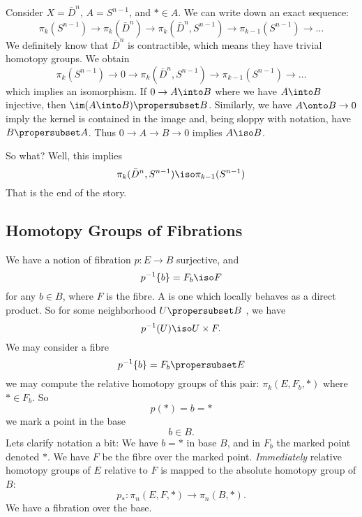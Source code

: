 Consider  $X=\bar{D}^n$, $A=S^{n-1}$, and $*\in A$. We can write
down an exact sequence:
\begin{equation}
\pi_{k}(S^{n-1})\to\pi_{k}(\bar{D}^{n})\to\pi_{k}(\bar{D}^{n},S^{n-1})\to
\pi_{k-1}(S^{n-1})\to\dots 
\end{equation}
We definitely know that $\bar{D}^n$ is contractible, which means
they have trivial homotopy groups. We obtain
\begin{equation}
\pi_{k}(S^{n-1})\to0\to\pi_{k}(\bar{D}^{n},S^{n-1})\to
\pi_{k-1}(S^{n-1})\to\dots 
\end{equation}
which implies an isomorphism.
If $0\to A\into B$ where we have $A\into B$ injective, then
$\im(A\into B)\propersubset B$. Similarly, we have $A\onto B\to
0$ imply the kernel is contained in the image and, being sloppy
with notation, have $B\propersubset A$. Thus $0\to A\to B\to 0$
implies $A\iso B$.

So what? Well, this implies
\begin{equation}
\pi_{k}(\bar{D}^{n},S^{n-1})\iso
\pi_{k-1}(S^{n-1})
\end{equation}
That is the end of the story.

\subsection{Homotopy Groups of Fibrations}
We have a notion of fibration $p\colon E\to B$ surjective, and
\begin{equation}
p^{-1}\{b\}=F_{b}\iso F
\end{equation}
for any $b\in B$, where $F$ is the fibre. A 
is one which locally behaves as a direct product. So for
some neighborhood $U\propersubset B$ , we have
\begin{equation}
p^{-1}(U)\iso U\times F.
\end{equation}
We may consider a fibre
\begin{equation}
p^{-1}\{b\}=F_{b}\propersubset E
\end{equation}
we may compute the relative homotopy groups of this pair:
$\pi_{k}(E,F_{b},*)$ where $*\in F_{b}$. So
\begin{equation}
p(*)=b=*
\end{equation}
we mark a point in the base
\begin{equation}
b\in B.
\end{equation}
Lets clarify notation a bit: We have $b=*$ in base $B$, and in
$F_{b}$ the marked point denoted $*$. We have $F$ be the fibre
over the marked point. \emph{Immediately} relative homotopy
groups of $E$ relative to $F$ is mapped to the absolute homotopy
group of $B$:
\begin{equation}
p_{*}\colon\pi_{n}(E,F,*)\to\pi_{n}(B,*).
\end{equation}
We have a fibration over the base.


